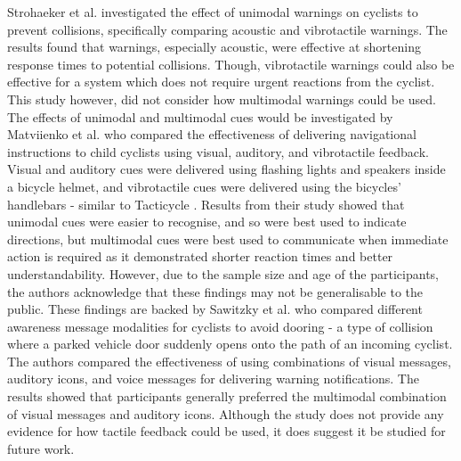 \documentclass{interim}
\begin{document}
Strohaeker et al. \cite{STROHAEKER2022151} investigated the effect of unimodal warnings on cyclists to prevent collisions, specifically comparing acoustic and vibrotactile warnings. The results found that warnings, especially acoustic, were effective at shortening response times to potential collisions. Though, vibrotactile warnings could also be effective for a system which does not require urgent reactions from the cyclist. This study however, did not consider how multimodal warnings could be used. The effects of unimodal and multimodal cues would be investigated by Matviienko et al. \cite{10.1145/3290605.3300850, 10.1145/3229434.3229479} who compared the effectiveness of delivering navigational instructions to child cyclists using visual, auditory, and vibrotactile feedback. Visual and auditory cues were delivered using flashing lights and speakers inside a bicycle helmet, and vibrotactile cues were delivered using the bicycles' handlebars - similar to Tacticycle \cite{10.1145/2371574.2371631}. Results from their study showed that unimodal cues were easier to recognise, and so were best used to indicate directions, but multimodal cues were best used to communicate when immediate action is required as it demonstrated shorter reaction times and better understandability. However, due to the sample size and age of the participants, the authors acknowledge that these findings may not be generalisable to the public. These findings are backed by Sawitzky et al. \cite{10.1145/3490099.3511127, mti6010003} who compared different awareness message modalities for cyclists to avoid dooring - a type of collision where a parked vehicle door suddenly opens onto the path of an incoming cyclist. The authors compared the effectiveness of using combinations of visual messages, auditory icons, and voice messages for delivering warning notifications. The results showed that participants generally preferred the multimodal combination of visual messages and auditory icons. Although the study does not provide any evidence for how tactile feedback could be used, it does suggest it be studied for future work.
\end{document}
